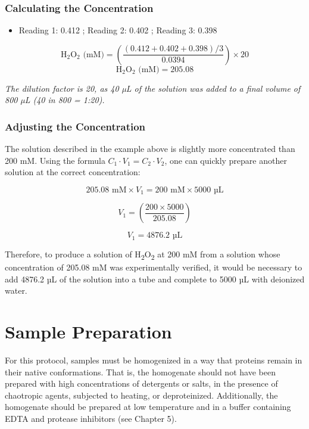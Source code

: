 \documentclass[
  9pt,
  american,
  a5paper,
  extrafontsizes,onecolumn,openright
  ]{memoir}
\providecommand{\tightlist}{%
  \setlength{\itemsep}{0pt}\setlength{\parskip}{0pt}}
\begin{document}
\subsubsection{Calculating the Concentration}\label{calculating-the-concentration}

\scriptsize

\normalsize

\begin{itemize}
\tightlist
\item
  Reading 1: 0.412 ; Reading 2: 0.402 ; Reading 3: 0.398
\end{itemize}

\[\text{H}_2 \text{O}_2 \text{ (mM)} = \left( \frac{\left( 0.412 + 0.402 + 0.398 \right) / 3}{0.0394} \right) \times 20\]
\[\text{H}_2 \text{O}_2 \text{ (mM)} = 205.08\]

\begin{greybox}[frametitle = Note]
\emph{The dilution factor is 20, as 40 µL of the solution was added to a final volume of 800 µL (40 in 800 = 1:20).}

\end{greybox}

\subsubsection{Adjusting the Concentration}\label{adjusting-the-concentration}

The solution described in the example above is slightly more concentrated than 200 mM. Using the formula \(C_1 \cdot V_1 = C_2 \cdot V_2\), one can quickly prepare another solution at the correct concentration:

\[205.08 \text{ mM}\times V_1 = 200 \text{ mM} \times 5000 \text{ µL}\]

\[V_1 = \left( \frac{200 \times 5000}{205.08} \right)\]

\[V_1 = 4876.2 \text{ µL}\]

Therefore, to produce a solution of H\textsubscript{2}O\textsubscript{2} at 200 mM from a solution whose concentration of 205.08 mM was experimentally verified, it would be necessary to add 4876.2 µL of the solution into a tube and complete to 5000 µL with deionized water.

\section{Sample Preparation}\label{sample_prep}

For this protocol, samples must be homogenized in a way that proteins remain in their native conformations. That is, the homogenate should not have been prepared with high concentrations of detergents or salts, in the presence of chaotropic agents, subjected to heating, or deproteinized. Additionally, the homogenate should be prepared at low temperature and in a buffer containing EDTA and protease inhibitors (see Chapter 5).
\end{document}
